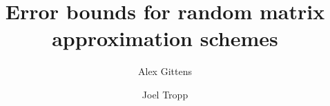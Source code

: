 \documentclass[11pt,letterpaper,twoside,reqno]{amsart}
\begin{document}
\title[Error bounds for random matrix approximation]{Error bounds for random matrix approximation schemes}

\author[A. Gittens]{Alex Gittens}
\address{
\vspace{-\bigskipamount}
(Corresponding Author) \\
Applied and Computational Mathematics \\ 
California Institute of Technology \\  \vspace{1em}
Annenberg Center, MC 305-16 \\
California Institute of Technology \\
1200 E. California Blvd. \\
Pasadena, CA 91125 \\
phone: 626-395-3553 \\
}

\author[J. Tropp]{Joel Tropp}
\address{
\vspace{-\bigskipamount}
Applied and Computational Mathematics \\
California Institute of Technology \\  \vspace{1em}
Annenberg Center, MC 305-16 \\
California Institute of Technology \\
1200 E. California Blvd. \\
Pasadena, CA 91125 \\
phone: 626-395-5957 \\
\vspace{\smallskipamount}
}

\end{document}
